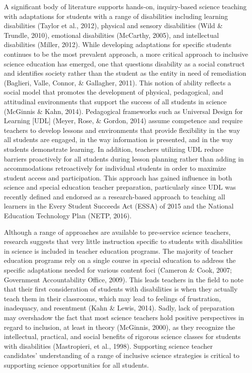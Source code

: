 \documentclass[11.5pt]{sig-alternate} %
\begin{document}
\begin{large}
A significant body of literature supports hands-on, inquiry-based science teaching with adaptations for students with a range of disabilities including learning disabilities (Taylor et al., 2012), physical and sensory disabilities (Wild \& Trundle, 2010), emotional disabilities (McCarthy, 2005), and intellectual disabilities (Miller, 2012).  While developing adaptations for specific students continues to be the most prevalent approach, a more critical approach to inclusive science education has emerged, one that questions disability as a social construct and identifies society rather than the student as the entity in need of remediation (Baglieri, Valle, Connor, \& Gallagher, 2011).  This notion of ability reflects a social model that promotes the development of physical, pedagogical, and attitudinal environments that support the success of all students in science (McGinnis \& Kahn, 2014).  Pedagogical frameworks such as Universal Design for Learning [UDL] (Meyer, Rose, \& Gordon, 2014) assume competence and require teachers to develop lessons and environments that provide flexibility in the way all students are engaged, in the way information is presented, and in the way students demonstrate learning. In addition, teachers utilizing UDL reduce barriers proactively for all students during lesson planning rather than adding in accommodations retroactively for individual students in order to maximize student access and participation. This approach has gained influence in both science and special education teacher preparation, particularly since UDL was recently defined and endorsed as a research-based approach to teaching all learners in the Every Student Succeeds Act (ESSA) of 2015 and the National Education Technology Plan (NETP, 2016).

Although a range of approaches are available to pre-service science teachers, research suggests that very little instruction specific to students with disabilities in science is included in teacher education programs.  The majority of teacher education programs rely on a single course in special education to address the specific adaptations needed for various content foci (Cameron \& Cook, 2007; Government Accountability Office, 2009). This leads teachers in the field to note that their first consideration of students with disabilities is when they actually teach them in their classrooms, which may lead to feelings of frustration, inadequacy, and resentment (Kahn \& Lewis, 2014). Sadly, lack of preparation may overshadow the fact that most science teachers hold positive perspectives in regard to inclusion, at least in theory (McGinnis, 2000), as they recognize the intellectual, practical, and social benefits of rigorous science classes for students with disabilities (Mastropieri, et al., 1998).  Supporting science teacher candidates’ understanding of a range of inclusive science strategies is critical to supporting science opportunities for all students. 


\end{large}
\end{document}

